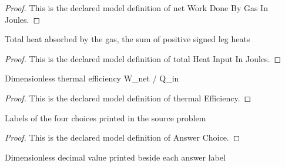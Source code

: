 \begin{proof}
  This is the declared model definition of net Work Done By Gas In Joules.
\end{proof}
\begin{definition}
  \label{def:physics:phyx-mini-0428:phyxminiproblems-problemphyxmini0428-totalheatinputinjoules}
  Total heat absorbed by the gas, the sum of positive signed leg heats
\end{definition}
\begin{proof}
  This is the declared model definition of total Heat Input In Joules.
\end{proof}
\begin{definition}
  \label{def:physics:phyx-mini-0428:phyxminiproblems-problemphyxmini0428-thermalefficiency}
  Dimensionless thermal efficiency W\_net / Q\_in
\end{definition}
\begin{proof}
  This is the declared model definition of thermal Efficiency.
\end{proof}
\begin{definition}
  \label{def:physics:phyx-mini-0428:phyxminiproblems-problemphyxmini0428-answerchoice}
  Labels of the four choices printed in the source problem
\end{definition}
\begin{proof}
  This is the declared model definition of Answer Choice.
\end{proof}
\begin{definition}
  \label{def:physics:phyx-mini-0428:phyxminiproblems-problemphyxmini0428-displayedefficiency}
  Dimensionless decimal value printed beside each answer label
\end{definition}
